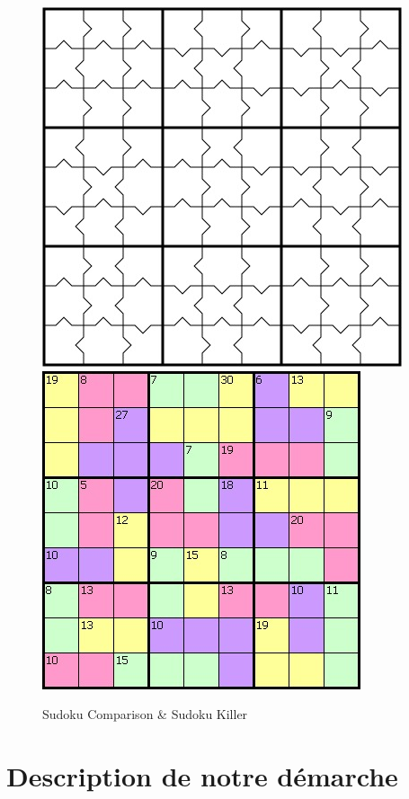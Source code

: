 \documentclass[a4paper,8pt,french,fleqn]{article}
\begin{document}
\begin{figure}[h]
  \begin{center}
    \vspace{0.5cm}
    \includegraphics[scale=0.45]{comparison.jpg}
    \hspace{1.5cm}
    \includegraphics[scale=0.50]{killer.jpg}
    \caption{Sudoku Comparison \& Sudoku Killer}
  \end{center}
\end{figure}

\newpage

\section{Description de notre démarche}
\end{document}
